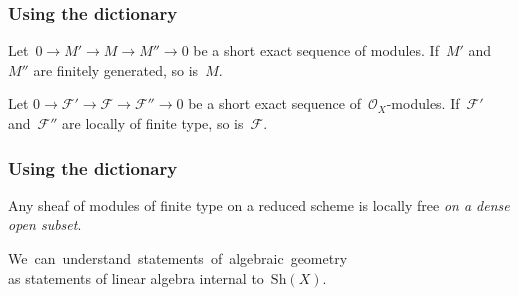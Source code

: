\documentclass[12pt,utf8,notheorems,compress,t]{beamer}
\newcommand{\F}{\mathcal{F}}
\renewcommand{\O}{\mathcal{O}}
\newcommand{\Sh}{\mathrm{Sh}}
\renewcommand{\_}{\mathpunct{.}}
\newcommand{\?}{\,{:}\,}
\newcommand{\hil}[1]{{\usebeamercolor[fg]{item}{\textbf{#1}}}}
\begin{document}
\begin{frame}[c]\frametitle{Using the dictionary}
  \begin{center}
    \begin{minipage}{0.75\textwidth}
      \begin{exampleblock}{}
        \justifying
        Let~$0 \to M' \to M \to M'' \to 0$ be a short exact sequence of
        modules. If~$M'$ and~$M''$ are finitely generated, so is~$M$.
      \end{exampleblock}
    \end{minipage}
    \medskip

    \scalebox{3}{$\Downarrow$}

    \begin{minipage}{0.75\textwidth}
      \begin{exampleblock}{}
        \justifying
        Let $0 \to \F' \to \F \to \F'' \to 0$ be a short exact sequence
        of~$\O_X$-modules. If~$\F'$ and~$\F''$ are locally of finite type, so
        is~$\F$.
      \end{exampleblock}
    \end{minipage}
  \end{center}
\end{frame}

\begin{frame}[c]\frametitle{Using the dictionary}
  \begin{center}

    \begin{minipage}{0.70\textwidth}
      \begin{exampleblock}{}
        \justifying
        Any sheaf of modules of finite type on a reduced scheme is locally free
        \emph{on a dense open subset}.
      \end{exampleblock}
    \end{minipage}
  \end{center}
  \pause
  \pause

  \hil{Motto:} \tabto{1.41cm} \mbox{We can understand statements of algebraic geometry} \\
  \tabto{1.41cm} as statements of linear algebra internal to~$\Sh(X)$.
\end{frame}
\end{document}
